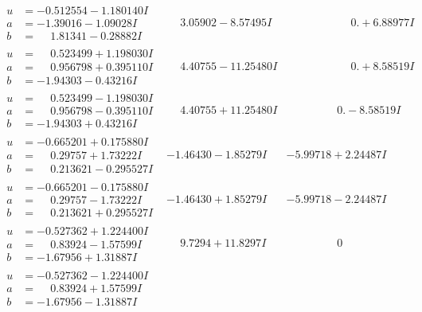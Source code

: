 \documentclass[1p]{elsarticle_modified}
\theoremstyle{definition}
\begin{document}
$$\begin{array}{c|c|c}
\begin{aligned}
u &= -0.512554 - 1.180140 I \\
a &= -1.39016 - 1.09028 I \\
b &= \phantom{-}1.81341 - 0.28882 I\end{aligned}
 & \phantom{-}3.05902 - 8.57495 I & \phantom{-0.000000 -}0. + 6.88977 I \\ \hline\begin{aligned}
u &= \phantom{-}0.523499 + 1.198030 I \\
a &= \phantom{-}0.956798 + 0.395110 I \\
b &= -1.94303 - 0.43216 I\end{aligned}
 & \phantom{-}4.40755 - 11.25480 I & \phantom{-0.000000 -}0. + 8.58519 I \\ \hline\begin{aligned}
u &= \phantom{-}0.523499 - 1.198030 I \\
a &= \phantom{-}0.956798 - 0.395110 I \\
b &= -1.94303 + 0.43216 I\end{aligned}
 & \phantom{-}4.40755 + 11.25480 I & \phantom{-0.000000 } 0. - 8.58519 I \\ \hline\begin{aligned}
u &= -0.665201 + 0.175880 I \\
a &= \phantom{-}0.29757 + 1.73222 I \\
b &= \phantom{-}0.213621 - 0.295527 I\end{aligned}
 & -1.46430 - 1.85279 I & -5.99718 + 2.24487 I \\ \hline\begin{aligned}
u &= -0.665201 - 0.175880 I \\
a &= \phantom{-}0.29757 - 1.73222 I \\
b &= \phantom{-}0.213621 + 0.295527 I\end{aligned}
 & -1.46430 + 1.85279 I & -5.99718 - 2.24487 I \\ \hline\begin{aligned}
u &= -0.527362 + 1.224400 I \\
a &= \phantom{-}0.83924 - 1.57599 I \\
b &= -1.67956 + 1.31887 I\end{aligned}
 & \phantom{-}9.7294 + 11.8297 I & \phantom{-0.000000 } 0 \\ \hline\begin{aligned}
u &= -0.527362 - 1.224400 I \\
a &= \phantom{-}0.83924 + 1.57599 I \\
b &= -1.67956 - 1.31887 I\end{aligned}

\end{array}$$
\end{document}
